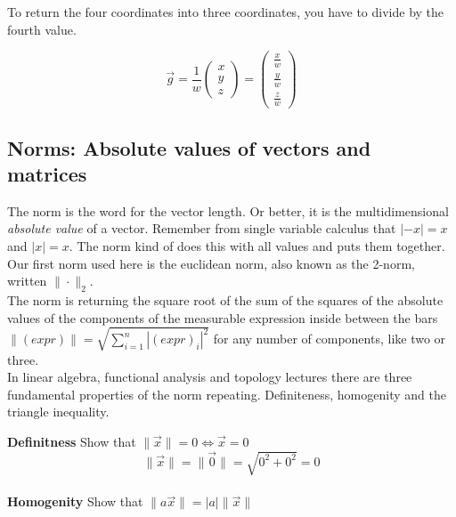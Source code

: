 \documentclass[a4paper]{article}
\begin{document}
To return the four coordinates into three coordinates, you have to divide by the fourth value.

\begin{displaymath}
\vec{g} = \frac{1}{w}\begin{pmatrix}x\\y\\z\end{pmatrix} =\begin{pmatrix}\frac{x}{w}\\\frac{y}{w}\\\frac{z}{w}\end{pmatrix} 
\end{displaymath}



\subsection{Norms: Absolute values of vectors and matrices}



The norm is the word for the vector length. Or better, it is the multidimensional \emph{absolute value} of a vector. Remember from single variable calculus that $|-x|=x$ and $|x|=x$. The norm kind of does this with all values and puts them together.
Our first norm used here is the euclidean norm, also known as the 2-norm, written $\|\cdot\|_{2}$. \\

 The norm is returning  the square root of the sum of the squares of the absolute values of the components of the measurable expression inside between the bars $\|(expr)\| = \sqrt{\sum_{i=1}^{n}|(expr)_{i}|^2}$ for any number of components, like two or three.\\

In linear algebra, functional analysis and topology lectures there are three fundamental properties of the norm repeating. Definiteness, homogenity and the triangle inequality. 

\textbf{Definitness} Show that $\|\vec{x}\| = 0 \iff \vec{x} = 0$\\

\begin{displaymath}
    \|\vec{x}\| = \|\vec{0}\| = \sqrt{0^{2} + 0^{2}} = 0
\end{displaymath}\\

\textbf{Homogenity} Show that $\|a\vec{x}\| = |a|\|\vec{x}\|$\\
\end{document}
